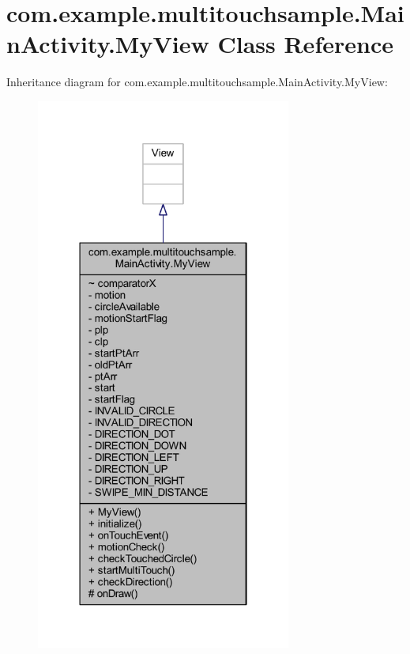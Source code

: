 \hypertarget{classcom_1_1example_1_1multitouchsample_1_1_main_activity_1_1_my_view}{}\section{com.\+example.\+multitouchsample.\+Main\+Activity.\+My\+View Class Reference}
\label{classcom_1_1example_1_1multitouchsample_1_1_main_activity_1_1_my_view}


Inheritance diagram for com.\+example.\+multitouchsample.\+Main\+Activity.\+My\+View\+:
\nopagebreak
\begin{figure}[H]
\begin{center}
\leavevmode
\includegraphics[width=238pt]{classcom_1_1example_1_1multitouchsample_1_1_main_activity_1_1_my_view__inherit__graph}
\end{center}
\end{figure}



